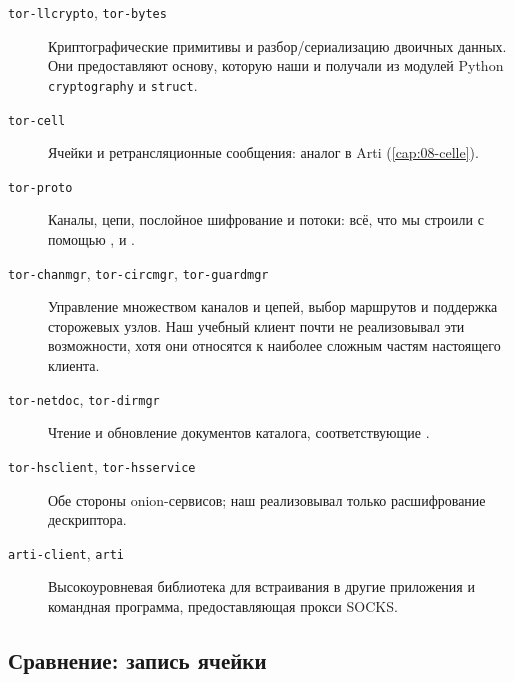 \begin{description}
  \item[\texttt{tor-llcrypto}, \texttt{tor-bytes}] Криптографические примитивы и разбор/сериализацию двоичных данных. Они предоставляют основу, которую наши  и  получали из модулей Python \texttt{cryptography} и \texttt{struct}.
  \item[\texttt{tor-cell}] Ячейки и ретрансляционные сообщения: аналог  в Arti (\cref{cap:08-celle}).
  \item[\texttt{tor-proto}] Каналы, цепи, послойное шифрование и потоки: всё, что мы строили с помощью ,  и .
  \item[\texttt{tor-chanmgr}, \texttt{tor-circmgr}, \texttt{tor-guardmgr}] Управление множеством каналов и цепей, выбор маршрутов и поддержка сторожевых узлов. Наш учебный клиент почти не реализовывал эти возможности, хотя они относятся к наиболее сложным частям настоящего клиента.
  \item[\texttt{tor-netdoc}, \texttt{tor-dirmgr}] Чтение и обновление документов каталога, соответствующие .
  \item[\texttt{tor-hsclient}, \texttt{tor-hsservice}] Обе стороны onion-сервисов; наш  реализовывал только расшифрование дескриптора.
  \item[\texttt{arti-client}, \texttt{arti}] Высокоуровневая библиотека для встраивания в другие приложения и командная программа, предоставляющая прокси SOCKS.
\end{description}

\subsection{Сравнение: запись ячейки}


